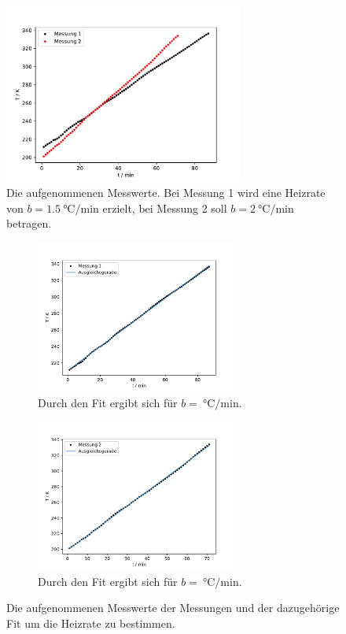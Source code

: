   \begin{figure}
    \centering
    \includegraphics[width = 0.7\textwidth]{build/zeit_temp.pdf}
    \caption{Die aufgenommenen Messwerte. Bei Messung 1 wird eine Heizrate von $b = \SI{1.5}{\celsius\per\minute}$ erzielt, 
    bei Messung 2 soll $b = \SI{2}{\celsius\per\minute}$ betragen.}
    \label{fig:t_T_plot}
  \end{figure} %

  \begin{figure}
    \begin{subfigure}[b]{.5\linewidth}
      \centering
      \includegraphics[height=5cm, keepaspectratio]{build/zeit_temp_fit_1.pdf}
      \caption{Durch den Fit ergibt sich für $b = \SI{}{\celsius\per\minute}$.}
    \label{fig:t_T_plot_1_Ausgleich}
    \end{subfigure}
    \begin{subfigure}[b]{.5\linewidth}
      \centering
      \includegraphics[height=5cm, keepaspectratio]{build/zeit_temp_fit_2.pdf}
      \caption{Durch den Fit ergibt sich für $b = \SI{}{\celsius\per\minute}$.}
    \label{fig:t_T_plot_2_Ausgleich} 
    \end{subfigure}
    \caption{Die aufgenommenen Messwerte der Messungen und der dazugehörige Fit um die Heizrate zu bestimmen.}
  \end{figure} %

